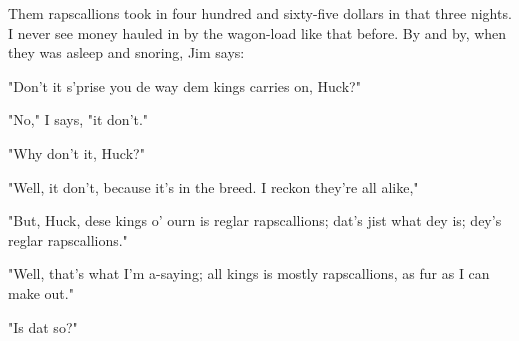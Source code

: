 Them rapscallions took in four hundred and sixty-five dollars in that
three nights.  I never see money hauled in by the wagon-load like that
before.  By and by, when they was asleep and snoring, Jim says:

"Don't it s'prise you de way dem kings carries on, Huck?"

"No," I says, "it don't."

"Why don't it, Huck?"

"Well, it don't, because it's in the breed.  I reckon they're all alike,"

"But, Huck, dese kings o' ourn is reglar rapscallions; dat's jist what
dey is; dey's reglar rapscallions."

"Well, that's what I'm a-saying; all kings is mostly rapscallions, as fur
as I can make out."

"Is dat so?"


